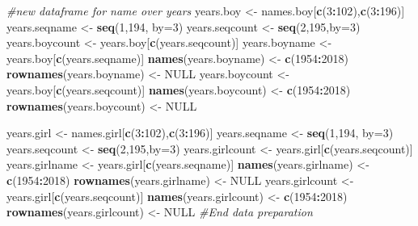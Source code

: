 \documentclass[]{article}
\newenvironment{Shaded}{\begin{snugshade}}{\end{snugshade}}
\newcommand{\CommentTok}[1]{\textcolor[rgb]{0.56,0.35,0.01}{\textit{#1}}}
\newcommand{\DataTypeTok}[1]{\textcolor[rgb]{0.13,0.29,0.53}{#1}}
\newcommand{\DecValTok}[1]{\textcolor[rgb]{0.00,0.00,0.81}{#1}}
\newcommand{\KeywordTok}[1]{\textcolor[rgb]{0.13,0.29,0.53}{\textbf{#1}}}
\newcommand{\NormalTok}[1]{#1}
\newcommand{\OperatorTok}[1]{\textcolor[rgb]{0.81,0.36,0.00}{\textbf{#1}}}
\newcommand{\OtherTok}[1]{\textcolor[rgb]{0.56,0.35,0.01}{#1}}
\newcommand{\StringTok}[1]{\textcolor[rgb]{0.31,0.60,0.02}{#1}}
\begin{document}
\begin{Shaded}
\begin{Highlighting}[]
{{\CommentTok{#new dataframe for name over years}
\NormalTok{years.boy <-}\StringTok{ }\NormalTok{names.boy[}\KeywordTok{c}\NormalTok{(}\DecValTok{3}\OperatorTok{:}\DecValTok{102}\NormalTok{),}\KeywordTok{c}\NormalTok{(}\DecValTok{3}\OperatorTok{:}\DecValTok{196}\NormalTok{)]}
\NormalTok{years.seqname <-}\StringTok{ }\KeywordTok{seq}\NormalTok{(}\DecValTok{1}\NormalTok{,}\DecValTok{194}\NormalTok{, }\DataTypeTok{by=}\DecValTok{3}\NormalTok{)}
\NormalTok{years.seqcount <-}\StringTok{ }\KeywordTok{seq}\NormalTok{(}\DecValTok{2}\NormalTok{,}\DecValTok{195}\NormalTok{,}\DataTypeTok{by=}\DecValTok{3}\NormalTok{)}
\NormalTok{years.boycount <-}\StringTok{ }\NormalTok{years.boy[}\KeywordTok{c}\NormalTok{(years.seqcount)]}
\NormalTok{years.boyname <-}\StringTok{ }\NormalTok{years.boy[}\KeywordTok{c}\NormalTok{(years.seqname)]}
\KeywordTok{names}\NormalTok{(years.boyname) <-}\StringTok{ }\KeywordTok{c}\NormalTok{(}\DecValTok{1954}\OperatorTok{:}\DecValTok{2018}\NormalTok{)}
\KeywordTok{rownames}\NormalTok{(years.boyname) <-}\StringTok{ }\OtherTok{NULL}
\NormalTok{years.boycount <-}\StringTok{ }\NormalTok{years.boy[}\KeywordTok{c}\NormalTok{(years.seqcount)]}
\KeywordTok{names}\NormalTok{(years.boycount) <-}\StringTok{ }\KeywordTok{c}\NormalTok{(}\DecValTok{1954}\OperatorTok{:}\DecValTok{2018}\NormalTok{)}
\KeywordTok{rownames}\NormalTok{(years.boycount) <-}\StringTok{ }\OtherTok{NULL}

\NormalTok{years.girl <-}\StringTok{ }\NormalTok{names.girl[}\KeywordTok{c}\NormalTok{(}\DecValTok{3}\OperatorTok{:}\DecValTok{102}\NormalTok{),}\KeywordTok{c}\NormalTok{(}\DecValTok{3}\OperatorTok{:}\DecValTok{196}\NormalTok{)]}
\NormalTok{years.seqname <-}\StringTok{ }\KeywordTok{seq}\NormalTok{(}\DecValTok{1}\NormalTok{,}\DecValTok{194}\NormalTok{, }\DataTypeTok{by=}\DecValTok{3}\NormalTok{)}
\NormalTok{years.seqcount <-}\StringTok{ }\KeywordTok{seq}\NormalTok{(}\DecValTok{2}\NormalTok{,}\DecValTok{195}\NormalTok{,}\DataTypeTok{by=}\DecValTok{3}\NormalTok{)}
\NormalTok{years.girlcount <-}\StringTok{ }\NormalTok{years.girl[}\KeywordTok{c}\NormalTok{(years.seqcount)]}
\NormalTok{years.girlname <-}\StringTok{ }\NormalTok{years.girl[}\KeywordTok{c}\NormalTok{(years.seqname)]}
\KeywordTok{names}\NormalTok{(years.girlname) <-}\StringTok{ }\KeywordTok{c}\NormalTok{(}\DecValTok{1954}\OperatorTok{:}\DecValTok{2018}\NormalTok{)}
\KeywordTok{rownames}\NormalTok{(years.girlname) <-}\StringTok{ }\OtherTok{NULL}
\NormalTok{years.girlcount <-}\StringTok{ }\NormalTok{years.girl[}\KeywordTok{c}\NormalTok{(years.seqcount)]}
\KeywordTok{names}\NormalTok{(years.girlcount) <-}\StringTok{ }\KeywordTok{c}\NormalTok{(}\DecValTok{1954}\OperatorTok{:}\DecValTok{2018}\NormalTok{)}
\KeywordTok{rownames}\NormalTok{(years.girlcount) <-}\StringTok{ }\OtherTok{NULL}
\CommentTok{#End data preparation}

}}
\end{Highlighting}
\end{Shaded}
\end{document}
